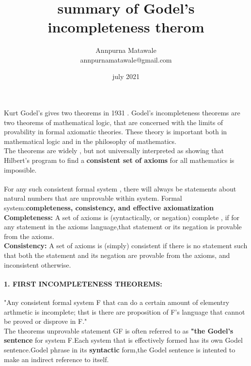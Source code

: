 \documentclass[a4 paper]{article}
\title{summary of Godel's incompleteness therom}
\author{Annpurna Matawale\\annpurnamatawale@gmail.com}
\date{july 2021}
\begin{document}
\maketitle

Kurt Godel's gives two theorems in 1931 . Godel's incompleteness theorems are two theorems of mathematical logic, that are concerned with the limits of provability in formal axiomatic theories. These theory is important both in mathematical logic and in the philosophy of mathematics.
\\The theorems are widely , but not universally interpreted as showing that Hilbert's program to find a \textbf{consistent set of axioms } for all mathematics is impossible.
\paragraph{}
For any such consistent formal system , there will always be statements about natural numbers that are unprovable within system.
Formal system:\textbf{completeness, consistency, and effective axiomatization}
\\
\textbf{Completeness: } A set of axioms is (syntactically, or negation) complete , if for any statement in the axioms language,that statement or its negation is provable from the axioms.
\\
\textbf{Consistency:} A set of axioms is (simply) consistent if there is no statement such that both the statement and its negation are provable from the axioms, and inconsistent otherwise.
\paragraph{\textbf{1. FIRST INCOMPLETENESS THEOREMS:}}

"Any consistent formal system F that can do a certain amount of elementry arthmetic is incomplete; thst is there are proposition of F's language that cannot be proved or disprove in F."
\\
The theorems unprovable statement GF is often referred to as \textbf{"the Godel's sentence} for system F.Each system that is effectively formed has its own Godel sentence.Godel phrase in its \textbf{syntactic} form,the Godel sentence is intented to make an indirect reference to itself.
\end{document}
